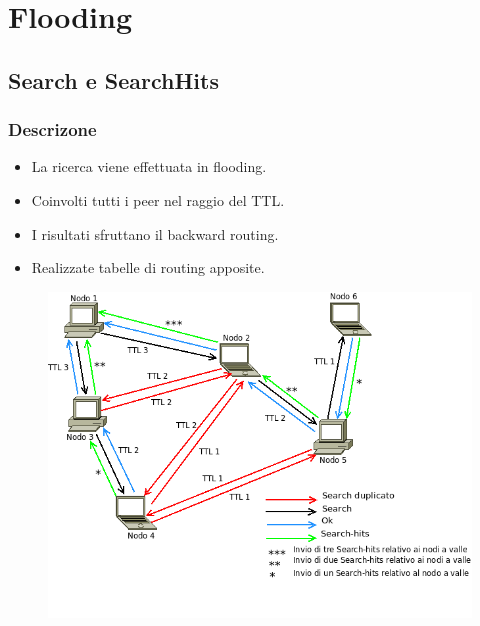 \documentclass[a4paper,italian,12pt]{beamer}
\begin{document}
	\section{Flooding}
		\subsection{Search e SearchHits}
			\begin{frame}
				\frametitle{Descrizone}
				\begin{itemize}
					\item La ricerca viene effettuata in flooding.
					\item Coinvolti tutti i peer nel raggio del TTL.
					\item I risultati sfruttano il backward routing.
					\item Realizzate tabelle di routing apposite.
				\end{itemize}
				\begin{figure}[H]
					\begin{center}
						\includegraphics[scale=0.3]{etc/Search_overlay.png}
					\end{center}
				\end{figure}
			\end{frame}
\end{document}
